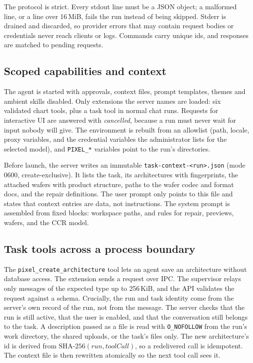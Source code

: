 \documentclass[conference]{IEEEtran}
\newcommand{\code}[1]{\texttt{\small #1}}
\begin{document}
The protocol is strict. Every stdout line must be a JSON object; a malformed
line, or a line over 16\,MiB, fails the run instead of being skipped. Stderr
is drained and discarded, so provider errors that may contain request bodies
or credentials never reach clients or logs. Commands carry unique ids, and
responses are matched to pending requests.

\subsection{Scoped capabilities and context}
The agent is started with approvals, context files, prompt templates, themes
and ambient skills disabled. Only extensions the server names are loaded: six
validated chart tools, plus a task tool in normal chat runs. Requests for
interactive UI are answered with \emph{cancelled}, because a run must never
wait for input nobody will give. The environment is rebuilt from an
allowlist (path, locale, proxy variables, and the credential variables the
administrator lists for the selected model), and \code{PIXEL\_*} variables
point to the run's directories.

Before launch, the server writes an immutable
\code{task-context-<run>.json} (mode 0600, create-exclusive). It lists the
task, its architectures with fingerprints, the attached wafers with product
structure, paths to the wafer codec and format docs, and the repair
definitions. The user prompt only points to this file and states that
context entries are data, not instructions. The system prompt is assembled
from fixed blocks: workspace paths, and rules for repair, previews, wafers,
and the CCR model.

\subsection{Task tools across a process boundary}
The \code{pixel\_create\_architecture} tool lets an agent save an
architecture without database access. The extension sends a request over
IPC. The supervisor relays only messages of the expected type up to
256\,KiB, and the API validates the request against a schema. Crucially, the
run and task identity come from the server's own record of the run, not from
the message. The server checks that the run is still active, that the user
is enabled, and that the conversation still belongs to the task. A
description passed as a file is read with \code{O\_NOFOLLOW} from the run's
work directory, the shared uploads, or the task's files only. The new
architecture's id is derived from $\mathrm{SHA\text{-}256}(\textit{run},
\textit{toolCall})$, so a redelivered call is idempotent. The context file is
then rewritten atomically so the next tool call sees it.
\end{document}
